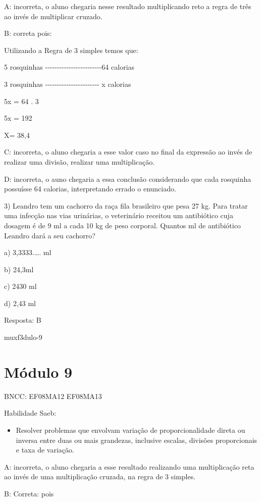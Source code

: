 {A: incorreta, o aluno chegaria nesse resultado multiplicando reto a
regra de três ao invés de multiplicar cruzado.

B: correta pois:

Utilizando a Regra de 3 simples temos que:

5 rosquinhas
-\/-\/-\/-\/-\/-\/-\/-\/-\/-\/-\/-\/-\/-\/-\/-\/-\/-\/-\/-\/-\/-\/-\/-64
calorias

3 rosquinhas
-\/-\/-\/-\/-\/-\/-\/-\/-\/-\/-\/-\/-\/-\/-\/-\/-\/-\/-\/-\/-\/-\/- x
calorias

5x = 64 . 3

5x = 192

X= 38,4

C: incorreta, o aluno chegaria a esse valor caso no final da expressão
ao invés de realizar uma divisão, realizar uma multiplicação.

D: incorreta, o auno chegaria a essa conclusão considerando que cada
rosquinha possuísse 64 calorias, interpretando errado o enunciado.

3) Leandro tem um cachorro da raça fila brasileiro que pesa 27 kg. Para
tratar uma infecção nas vias urinárias, o veterinário receitou um
antibiótico cuja dosagem é de 9 ml a cada 10 kg de peso corporal.
Quantos ml de antibiótico Leandro dará a seu cachorro?

a) 3,3333.\ldots. ml

b) 24,3ml

c) 2430 ml

d) 2,43 ml

Resposta: B

muxf3dulo-9}{%
\section{Módulo 9}

BNCC: EF08MA12 EF08MA13

Habilidade Saeb:

\begin{itemize}
\tightlist
\item
  Resolver problemas que envolvam variação de proporcionalidade direta
  ou inversa entre duas ou mais grandezas, inclusive escalas, divisões
  proporcionais e taxa de variação.
\end{itemize}

A: incorreta, o aluno chegaria a esse resultado realizando uma
multiplicação reta ao invés de uma multiplicação cruzada, na regra de 3
simples.

B: Correta: pois

}
